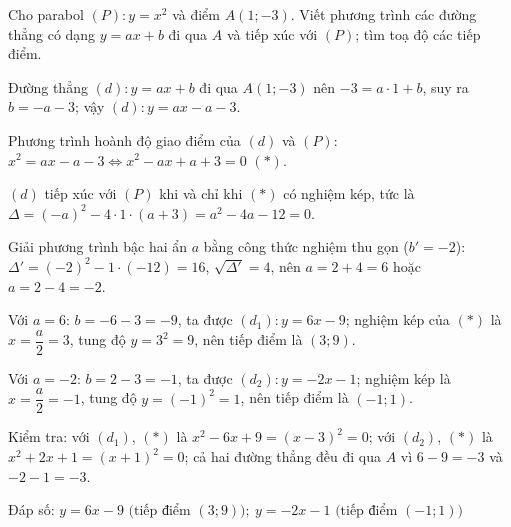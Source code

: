 \begin{problem}[9DS-HSB2-017]
Cho parabol $(P)\colon y = x^2$ và điểm $A(1; -3)$. Viết phương trình các đường thẳng có dạng $y = ax + b$ đi qua $A$ và tiếp xúc với $(P)$; tìm toạ độ các tiếp điểm.

\begin{solution}
Đường thẳng $(d)\colon y = ax + b$ đi qua $A(1; -3)$ nên $-3 = a \cdot 1 + b$, suy ra $b = -a - 3$; vậy $(d)\colon y = ax - a - 3$.

Phương trình hoành độ giao điểm của $(d)$ và $(P)$: $x^2 = ax - a - 3 \Leftrightarrow x^2 - ax + a + 3 = 0$ $(*)$.

$(d)$ tiếp xúc với $(P)$ khi và chỉ khi $(*)$ có nghiệm kép, tức là $\Delta = (-a)^2 - 4 \cdot 1 \cdot (a + 3) = a^2 - 4a - 12 = 0$.

Giải phương trình bậc hai ẩn $a$ bằng công thức nghiệm thu gọn ($b' = -2$): $\Delta' = (-2)^2 - 1 \cdot (-12) = 16$, $\sqrt{\Delta'} = 4$, nên $a = 2 + 4 = 6$ hoặc $a = 2 - 4 = -2$.

Với $a = 6$: $b = -6 - 3 = -9$, ta được $(d_1)\colon y = 6x - 9$; nghiệm kép của $(*)$ là $x = \dfrac{a}{2} = 3$, tung độ $y = 3^2 = 9$, nên tiếp điểm là $(3; 9)$.

Với $a = -2$: $b = 2 - 3 = -1$, ta được $(d_2)\colon y = -2x - 1$; nghiệm kép là $x = \dfrac{a}{2} = -1$, tung độ $y = (-1)^2 = 1$, nên tiếp điểm là $(-1; 1)$.

Kiểm tra: với $(d_1)$, $(*)$ là $x^2 - 6x + 9 = (x - 3)^2 = 0$; với $(d_2)$, $(*)$ là $x^2 + 2x + 1 = (x + 1)^2 = 0$; cả hai đường thẳng đều đi qua $A$ vì $6 - 9 = -3$ và $-2 - 1 = -3$.

Đáp số: $\boxed{y = 6x - 9 \text{ (tiếp điểm } (3; 9)\text{)};\ y = -2x - 1 \text{ (tiếp điểm } (-1; 1)\text{)}}$
\end{solution}
\end{problem}

